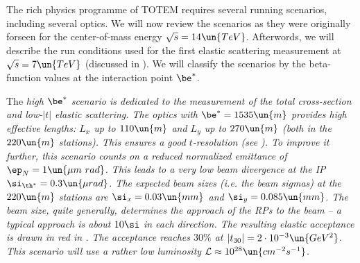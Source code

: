 

The rich physics programme of TOTEM requires several running scenarios, including several optics. We will now review the scenarios as they were originally forseen for the center-of-mass energy $\sqrt s = 14\un{TeV}$. Afterwords, we will describe the run conditions used for the first elastic scattering measurement at $\sqrt s = 7\un{TeV}$ (discussed in ). We will classify the scenarios by the beta-function values at the interaction point $\be^*$.

\> The \em{high $\be^*$} scenario is dedicated to the measurement of the total cross-section and low-$|t|$ elastic scattering. The optics with $\be^* = 1535\un{m}$ provides high effective lengths: $L_x$ up to $110\un{m}$ and $L_y$ up to $270\un{m}$ (both in the $220\un{m}$ stations). This ensures a good $t$-resolution (see ). To improve it further, this scenario counts on a reduced normalized emittance of $\ep_N=1\un{\mu m\ rad}$. This leads to a very low beam divergence at the IP $\si_{\th^*} = 0.3\un{\mu rad}$. The expected beam sizes (i.e. the beam sigmas) at the $220\un{m}$ stations are $\si_x = 0.03\un{mm}$ and $\si_y = 0.085\un{mm}$. The beam size, quite generally, determines the approach of the RPs to the beam -- a typical approach is about $10\si$ in each direction. The resulting elastic acceptance is drawn in red in . The acceptance reaches $30\percent$ at $|t_{30}| = 2\cdot10^{-3}\un{GeV^2}$. This scenario will use a rather low luminosity ${\cal L} \approx 10^{28} \un{cm^{-2}s^{-1}}$.


